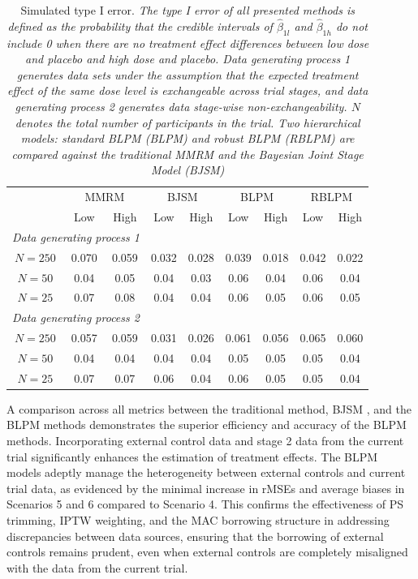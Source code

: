 \begin{table} 
\caption{\label{tab:TypeI_longitudinal} \centering Simulated type I error. \protect \linebreak
\small
\textit{The type I error of all presented methods is defined as the probability that the credible intervals of $\widehat{\beta}_{1l}$ and $\widehat{\beta}_{1h}$ do not include 0 when there are no treatment effect differences between low dose and placebo and high dose and placebo. Data generating process 1 generates data sets under the assumption that the expected treatment effect of the same dose level is exchangeable across trial stages, and data generating process 2 generates data stage-wise non-exchangeability. $N$ denotes the total number of participants in the trial. Two hierarchical models: standard \ac{BLPM} (BLPM) and robust \ac{BLPM} (RBLPM) are compared against the traditional MMRM and the Bayesian Joint Stage Model (BJSM)}}
\centering
\begin{tabular}{ccccccccc}
\hline
\centering \multirow{2}{*}{Sample Size} & \multicolumn{2}{c}{MMRM} & \multicolumn{2}{c}{BJSM} & \multicolumn{2}{c}{BLPM} & \multicolumn{2}{c}{RBLPM}\\
\centering  & Low & High & Low & High & Low & High & Low & High \\
\hline
\multicolumn{3}{l}{\textit{Data generating process 1}} &&&& \\
$N = 250$ & 0.070 & 0.059  & 0.032 & 0.028 & 0.039 & 0.018 & 0.042 & 0.022 \\
$N = 50$ & 0.04 & 0.05  & 0.04 & 0.03 & 0.06 & 0.04 & 0.06 & 0.04 \\
$N = 25$ & 0.07 & 0.08 & 0.04 & 0.04 & 0.06 & 0.05 & 0.06 & 0.05 \\

\multicolumn{3}{l}{\textit{Data generating process 2}} &&&& \\
$N = 250$ & 0.057 & 0.059 & 0.031 & 0.026 & 0.061 & 0.056 & 0.065 & 0.060 \\
$N = 50$ & 0.04 & 0.04 & 0.04 & 0.04 & 0.05 & 0.05 & 0.05 & 0.04 \\
$N = 25$ & 0.07 & 0.07 & 0.06 & 0.04 & 0.06 & 0.05 & 0.05 & 0.04\\
\hline
\end{tabular}
\end{table}

A comparison across all metrics between the traditional method, \ac{BJSM} , and the \ac{BLPM} methods demonstrates the superior efficiency and accuracy of the \ac{BLPM} methods. Incorporating external control data and stage 2 data from the current trial significantly enhances the estimation of treatment effects. The \ac{BLPM} models adeptly manage the heterogeneity between external controls and current trial data, as evidenced by the minimal increase in rMSEs and average biases in Scenarios 5 and 6 compared to Scenario 4. This confirms the effectiveness of \ac{PS} trimming, \ac{IPTW} weighting, and the \ac{MAC} borrowing structure in addressing discrepancies between data sources, ensuring that the borrowing of external controls remains prudent, even when external controls are completely misaligned with the data from the current trial.


